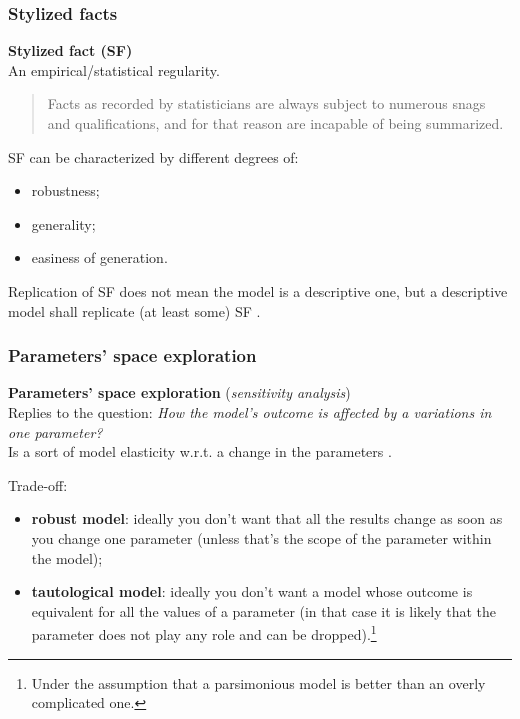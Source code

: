 \documentclass[10pt]{beamer}
\begin{document}
\begin{frame}[c]\frametitle{Stylized facts}
	\alert{\textbf{Stylized fact (SF)}} 
	\\ An empirical/statistical regularity. \bigskip

	\begin{quote}
		Facts as recorded by statisticians are always subject to numerous snags and qualifications, and for that reason are incapable of being summarized. \\ \hfill \citet{kaldor1957styfacts}
	\end{quote}

	SF can be characterized by different degrees of:
	\begin{itemize}
		\item robustness;
		\item generality;
		\item easiness of generation.
	\end{itemize} \bigskip

	Replication of SF does not mean the model is a descriptive one, but a descriptive model shall replicate (at least some) SF \citep{brock1999scaling,buchanan2012stylizedfact,fagiolo2019validation,guerini2017validation}.
\end{frame}


\begin{frame}[c]\frametitle{Parameters' space exploration}
    \alert{\textbf{Parameters' space exploration} (\emph{sensitivity analysis})}
    \\ Replies to the question: \emph{How the model's outcome is affected by a variations in one parameter?} \\ Is a sort of model elasticity w.r.t. a change in the parameters \citep{salle2014kriging}. \smallskip

    Trade-off:
    \begin{itemize}
    	\item \textbf{robust model}: ideally you don't want that all the results change as soon as you change one parameter (unless that's the scope of the parameter within the model);
    	\item \textbf{tautological model}: ideally you don't want a model whose outcome is equivalent for all the values of a parameter (in that case it is likely that the parameter does not play any role and can be dropped).\footnote{Under the assumption that a parsimonious model is better than an overly complicated one.}
    \end{itemize}
\end{frame}
\end{document}
